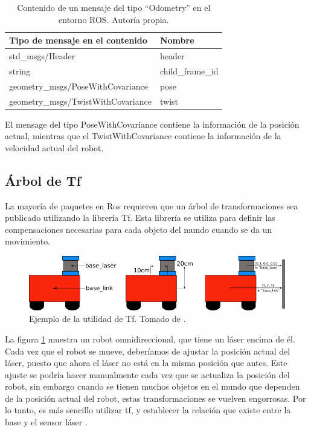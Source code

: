\begin{table}[H]
\caption{Contenido de un mensaje del tipo ``Odometry'' en el entorno ROS. Autoría propia.}
\begin{tabular}{|l|l|}
\hline
Tipo de mensaje en el contenido    & Nombre           \\ \hline
std\_msgs/Header                   & header           \\ \hline
string                             & child\_frame\_id \\ \hline
geometry\_msgs/PoseWithCovariance  & pose             \\ \hline
geometry\_msgs/TwistWithCovariance & twist            \\ \hline
\end{tabular}
\label{T:odometría}
\end{table}

El mensage del tipo PoseWithCovariance contiene la información de la posición actual, mientras que el TwistWithCovariance contiene la información de la velocidad actual del robot.

\subsection{Árbol de Tf}

La mayoría de paquetes en Ros requieren que un árbol de transformaciones sea publicado utilizando la librería Tf. Esta librería se utiliza para definir las compensaciones necesarias para cada objeto del mundo cuando se da un movimiento.

\begin{figure}[H]
\centering
\includegraphics[scale=0.6]{imagenes/simple_robot.png}
\caption{Ejemplo de la utilidad de Tf. Tomado de \cite{ROSTF}.}
\label{F:tf}
\end{figure}

La figura \ref{F:tf} muestra un robot omnidireccional, que tiene un láser encima de él. Cada vez que el robot se mueve, deberíamos de ajustar la posición actual del láser, puesto que ahora el láser no está en la misma posición que antes. Este ajuste se podría hacer manualmente cada vez que se actualiza la posición del robot, sin embargo cuando se tienen muchos objetos en el mundo que dependen de la posición actual del robot, estas transformaciones se vuelven engorrosas. Por lo tanto, es más sencillo utilizar tf, y establecer la relación que existe entre la base y el sensor láser \cite{ROSTF}.

